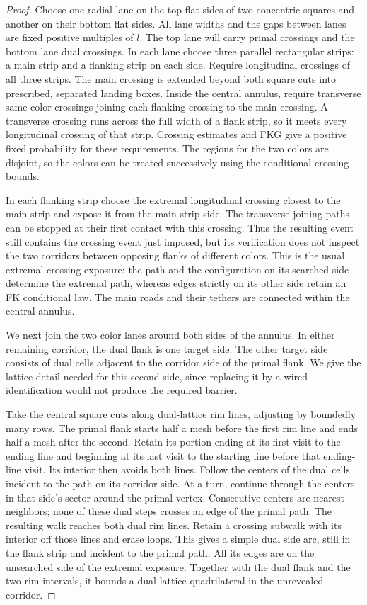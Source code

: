 \begin{proof}
Choose one radial lane on the top flat sides of two concentric squares
and another on their bottom flat sides.  All lane widths and the gaps
between lanes are fixed positive multiples of $l$.  The top lane will
carry primal crossings and the bottom lane dual crossings.  In each
lane choose three parallel rectangular strips: a main strip and a
flanking strip on each side.  Require longitudinal crossings of all
three strips.  The main crossing is extended beyond both square cuts
into prescribed, separated landing boxes.  Inside the central annulus,
require transverse same-color crossings joining each flanking
crossing to the main crossing.  A transverse crossing runs across the
full width of a flank strip, so it meets every longitudinal crossing
of that strip.  Crossing estimates and FKG give a positive fixed
probability for these requirements.  The regions for the two colors
are disjoint, so the colors can be treated successively using the
conditional crossing bounds.

In each flanking strip choose the extremal longitudinal crossing
closest to the main strip and expose it from the main-strip side.
The transverse joining paths can be stopped at their first contact
with this crossing.  Thus the resulting event still contains the
crossing event just imposed, but its verification does not inspect
the two corridors between opposing flanks of different colors.
This is the usual extremal-crossing exposure: the path and the
configuration on its searched side determine the extremal path,
whereas edges strictly on its other side retain an FK conditional
law.  The main roads and their tethers are connected within the
central annulus.

We next join the two color lanes around both sides of the annulus.
In either remaining corridor, the dual flank is one target side.
The other target side consists of dual cells adjacent to the
corridor side of the primal flank.  We give the lattice detail needed
for this second side, since replacing it by a wired identification
would not produce the required barrier.

Take the central square cuts along dual-lattice rim lines, adjusting
by boundedly many rows.  The primal flank starts half a mesh before
the first rim line and ends half a mesh after the second.  Retain its
portion ending at its first visit to the ending line and beginning
at its last visit to the starting line before that ending-line visit.
Its interior then avoids both lines.  Follow
the centers of the dual cells incident to the path on its corridor
side.  At a turn, continue through the centers in that side's sector
around the primal vertex.  Consecutive centers are nearest neighbors;
none of these dual steps crosses an edge of the primal path.  The
resulting walk reaches both dual rim lines.  Retain a crossing
subwalk with its interior off those lines and erase loops.  This
gives a simple dual side arc, still in the flank strip and incident
to the primal path.  All its edges are on the unsearched side of
the extremal exposure.  Together with the dual flank and the two
rim intervals, it bounds a dual-lattice quadrilateral in the
unrevealed corridor.


\end{proof}
